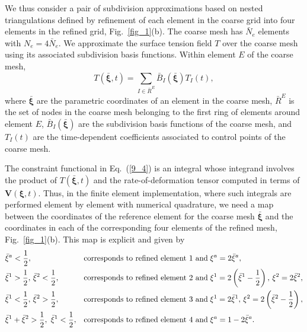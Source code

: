 We thus consider a pair of subdivision approximations based on nested triangulations defined by refinement of each element in the coarse grid into four elements in the refined grid, Fig.~\ref{fig_1}(b). The coarse mesh has $\bar{N}_e$ elements with $N_e = 4\bar{N}_e$. We approximate the surface tension field $T$ over the coarse mesh using its associated subdivision basis functions. Within element $E$ of the coarse mesh, 
\begin{equation} \label{discr_T}
    T(\bar{\bm{\xi}},t)=  \underset{I \in \bar{R}^E}{\mathrm{\sum}} \bar{B}_I(\bar{\bm{\xi}})T_I(t),
\end{equation} 
where $\bar{\bm{\xi}}$ are the parametric coordinates of an element in the coarse mesh, $\bar{R}^E$ is the set of nodes in the coarse mesh belonging to the first ring of elements around element $E$, $\bar{B}_I(\bar{\bm{\xi}})$ are the subdivision basis functions of the coarse mesh, and $T_I(t)$ are the time-dependent coefficients associated to control points of the coarse mesh. 

The constraint functional in Eq.~(\ref{9_4}) is an integral whose integrand involves the product of $T(\bar{\bm{\xi}},t)$ and the rate-of-deformation tensor computed in terms of $\bm{V}(\bm{\xi},t)$. Thus, in the finite element implementation, where such integrals are performed element by element with numerical quadrature, we need a map between the coordinates of the reference element for the coarse mesh $\bar{\bm{\xi}}$ and the coordinates in each of the corresponding four elements of the refined mesh, Fig.~\ref{fig_1}(b). This map is explicit and given by
\begin{align} 
& \bar{\xi}^a<\frac{1}{2}, & \textup{corresponds to refined element 1 and}\; &  \xi^a = 2\bar{\xi}^a, \nonumber \\
& \bar{\xi}^1>\frac{1}{2}, \, \bar{\xi}^2<\frac{1}{2}, & \textup{corresponds to refined element 2 and}\; & \xi^1 = 2\left(\bar{\xi}^1-\frac{1}{2}\right) , \, \xi^2 = 2\bar{\xi}^2 , \nonumber \\
& \bar{\xi}^1<\frac{1}{2}   , \,\bar{\xi}^2>\frac{1}{2}, & \textup{corresponds to refined element 3 and}\; & \xi^1 = 2\bar{\xi}^1,\, \xi^2 = 2\left(\bar{\xi}^2-\frac{1}{2}\right) , \nonumber \\
& \bar{\xi}^1 + \bar{\xi}^2>\frac{1}{2},~  \bar{\xi}^1<\frac{1}{2}, & \textup{corresponds to refined element 4 and}\; & \xi^a = 1-2\bar{\xi}^a.\nonumber  
\end{align}


